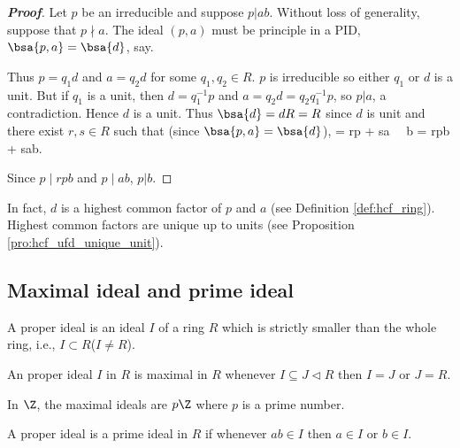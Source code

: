 \begin{proof}[\bf Proof]
Let $p$ be an irreducible and suppose $p | ab$. Without loss of generality, suppose that $p \nmid a$. The ideal $(p, a)$ must be principle in a PID, $\bsa{p, a} = \bsa{d}$, say.

Thus $p = q_1d$ and $a = q_2d$ for some $q_1,q_2 \in R$. $p$ is irreducible so either $q_1$ or $d$ is a unit. But if $q_1$ is a unit, then $d = q_1^{-1} p$ and $a = q_2d = q_2q^{-1}_1 p$, so $p | a$, a contradiction. Hence $d$ is a unit. Thus $\bsa{d} = dR = R$ since $d$ is unit and there exist $r, s \in R$ such that (since $\bsa{p, a} = \bsa{d}$),
 = rp + sa \ \ra \ b = rpb + sab.
\ee

Since $p \mid rpb$ and $p \mid ab$, $p | b$.
\end{proof}

\begin{remark}
In fact, $d$ is a highest common factor of $p$ and $a$ (see Definition \ref{def:hcf_ring}). Highest common factors are unique up to units (see Proposition \ref{pro:hcf_ufd_unique_unit}).%
\end{remark}


\subsection{Maximal ideal and prime ideal}

\begin{definition}\label{def:proper_ideal}
A proper ideal is an ideal $I$ of a ring $R$ which is strictly smaller than the whole ring, i.e., $I\subset R$($I\neq R$).
\end{definition}

\begin{definition}
An proper ideal $I$ in $R$ is maximal in $R$ whenever $I \subseteq J \lhd R$ then $I = J$ or $J = R$.
\end{definition}

\begin{example}
In $\Z$, the maximal ideals are $p\Z$ where $p$ is a prime number.
\end{example}


\begin{definition}\label{def:prime_ideal}
A proper ideal is a prime ideal in $R$ if whenever $ab \in I$ then $a \in I$ or $b \in I$.
\end{definition}

